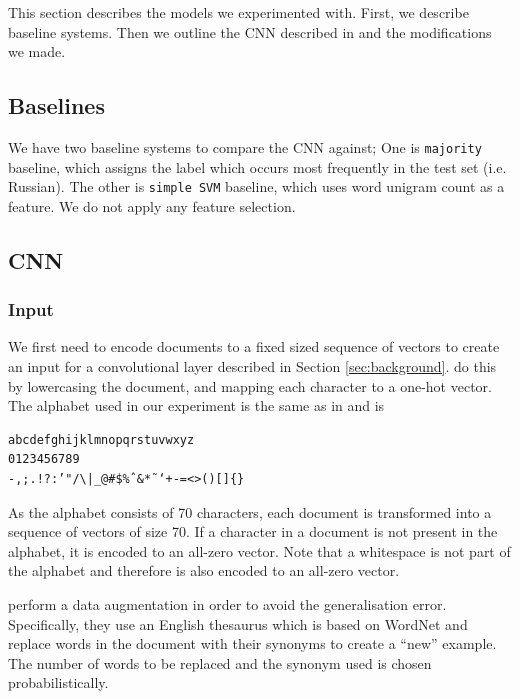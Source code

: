 This section describes the models we experimented with.
First, we describe baseline systems.
Then we outline the CNN described in \citep{zhang2015character} and the modifications we made.
\subsection{Baselines}
We have two baseline systems to compare the CNN against;
One is \texttt{majority} baseline, which assigns the label which occurs most frequently in the test set (i.e. Russian).
The other is \texttt{simple SVM} baseline, which uses word unigram count as a feature.
We do not apply any feature selection.
\subsection{CNN}
\subsubsection{Input}
\label{sub:input}
We first need to encode documents to a fixed sized sequence of vectors to create an input for a convolutional layer described in Section \ref{sec:background}.
\cite{zhang2015character} do this by lowercasing the document, and mapping each character to a one-hot vector.
The alphabet used in our experiment is the same as in \citep{zhang2015character} and is 
\begin{verbatim}
abcdefghijklmnopqrstuvwxyz
0123456789
-,;.!?:’"/\|_@#$%ˆ&*˜‘+-=<>()[]{}
\end{verbatim} 
As the alphabet consists of 70 characters, each document is transformed into a sequence of vectors of size 70.
If a character in a document is not present in the alphabet, it is encoded to an all-zero vector.
Note that a whitespace is not part of the alphabet and therefore is also encoded to an all-zero vector.

\cite{zhang2015character} perform a data augmentation in order to avoid the generalisation error.
Specifically, they use an English thesaurus which is based on WordNet \citep{fellbaum1998wordnet} and replace words in the document with their synonyms to create a ``new'' example.
The number of words to be replaced and the synonym used is chosen probabilistically.

